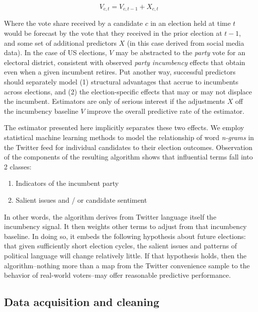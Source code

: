 \documentclass{article}
\begin{document}
\begin{equation}
  \label{eq:1}
  V_{c,t} = V_{c,t - 1} + X_{c,t}
\end{equation}

Where the vote share received by a candidate $c$ in an election held
at time $t$ would be forecast by the vote that they received in the
prior election at $t-1$, and some set of additional predictors $X$ (in
this case derived from social media data). In the case of US
elections, $V$ may be abstracted to the \textit{party} vote for an
electoral district, consistent with observed \textit{party incumbency}
effects that obtain even when a given incumbent retires. Put another
way, successful predictors should separately model (1) structural
advantages that accrue to incumbents across elections, and (2) the
election-specific effects that may or may not displace the
incumbent. Estimators are only of serious interest if the adjustments
$X$ off the incumbency baseline $V$ improve the overall predictive
rate of the estimator. 

The estimator presented here implicitly separates these two
effects. We employ statistical machine learning methods to model the
relationship of word \textit{n-grams} in the Twitter feed for
individual candidates to their election outcomes. Observation of the
components of the resulting algorithm shows that influential terms
fall into 2 classes:

\begin{enumerate}
\item Indicators of the incumbent party
\item Salient issues and / or candidate sentiment
\end{enumerate}

In other words, the algorithm derives from Twitter language itself the
incumbency signal. It then weights other terms to adjust from that
incumbency baseline. In doing so, it embeds the following hypothesis
about future elections: that given sufficiently short election cycles,
the salient issues and patterns of political language will change
relatively little. If that hypothesis holds, then the
algorithm--nothing more than a map from the Twitter convenience sample
to the behavior of real-world voters--may offer reasonable predictive
performance.

\subsection{Data acquisition and cleaning}
\label{sec:data-acquisition}
\end{document}
